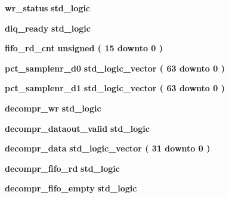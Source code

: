 \begin{DoxyCompactItemize}
\item 
{\bf wr\+\_\+status} {\bfseries \textcolor{comment}{std\+\_\+logic}\textcolor{vhdlchar}{ }} 
\item 
{\bf diq\+\_\+ready} {\bfseries \textcolor{comment}{std\+\_\+logic}\textcolor{vhdlchar}{ }} 
\item 
{\bf fifo\+\_\+rd\+\_\+cnt} {\bfseries \textcolor{comment}{unsigned}\textcolor{vhdlchar}{ }\textcolor{vhdlchar}{(}\textcolor{vhdlchar}{ }\textcolor{vhdlchar}{ } \textcolor{vhdldigit}{15} \textcolor{vhdlchar}{ }\textcolor{keywordflow}{downto}\textcolor{vhdlchar}{ }\textcolor{vhdlchar}{ } \textcolor{vhdldigit}{0} \textcolor{vhdlchar}{ }\textcolor{vhdlchar}{)}\textcolor{vhdlchar}{ }} 
\item 
{\bf pct\+\_\+samplenr\+\_\+d0} {\bfseries \textcolor{comment}{std\+\_\+logic\+\_\+vector}\textcolor{vhdlchar}{ }\textcolor{vhdlchar}{(}\textcolor{vhdlchar}{ }\textcolor{vhdlchar}{ } \textcolor{vhdldigit}{63} \textcolor{vhdlchar}{ }\textcolor{keywordflow}{downto}\textcolor{vhdlchar}{ }\textcolor{vhdlchar}{ } \textcolor{vhdldigit}{0} \textcolor{vhdlchar}{ }\textcolor{vhdlchar}{)}\textcolor{vhdlchar}{ }} 
\item 
{\bf pct\+\_\+samplenr\+\_\+d1} {\bfseries \textcolor{comment}{std\+\_\+logic\+\_\+vector}\textcolor{vhdlchar}{ }\textcolor{vhdlchar}{(}\textcolor{vhdlchar}{ }\textcolor{vhdlchar}{ } \textcolor{vhdldigit}{63} \textcolor{vhdlchar}{ }\textcolor{keywordflow}{downto}\textcolor{vhdlchar}{ }\textcolor{vhdlchar}{ } \textcolor{vhdldigit}{0} \textcolor{vhdlchar}{ }\textcolor{vhdlchar}{)}\textcolor{vhdlchar}{ }} 
\item 
{\bf decompr\+\_\+wr} {\bfseries \textcolor{comment}{std\+\_\+logic}\textcolor{vhdlchar}{ }} 
\item 
{\bf decompr\+\_\+dataout\+\_\+valid} {\bfseries \textcolor{comment}{std\+\_\+logic}\textcolor{vhdlchar}{ }} 
\item 
{\bf decompr\+\_\+data} {\bfseries \textcolor{comment}{std\+\_\+logic\+\_\+vector}\textcolor{vhdlchar}{ }\textcolor{vhdlchar}{(}\textcolor{vhdlchar}{ }\textcolor{vhdlchar}{ } \textcolor{vhdldigit}{31} \textcolor{vhdlchar}{ }\textcolor{keywordflow}{downto}\textcolor{vhdlchar}{ }\textcolor{vhdlchar}{ } \textcolor{vhdldigit}{0} \textcolor{vhdlchar}{ }\textcolor{vhdlchar}{)}\textcolor{vhdlchar}{ }} 
\item 
{\bf decompr\+\_\+fifo\+\_\+rd} {\bfseries \textcolor{comment}{std\+\_\+logic}\textcolor{vhdlchar}{ }} 
\item 
{\bf decompr\+\_\+fifo\+\_\+empty} {\bfseries \textcolor{comment}{std\+\_\+logic}\textcolor{vhdlchar}{ }} 

\end{DoxyCompactItemize}

